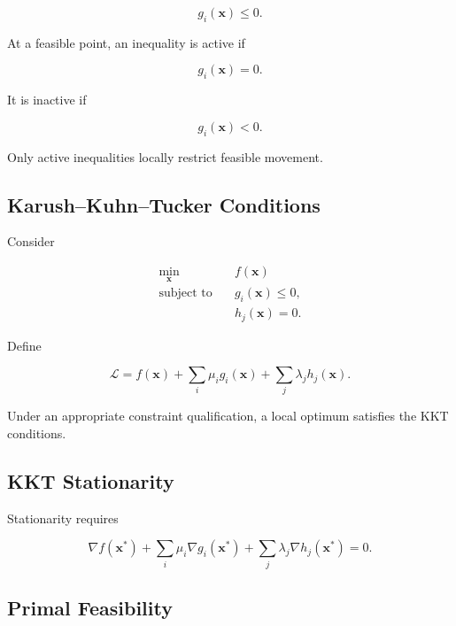 \[
\boxed{
g_i(\mathbf{x})\leq0.
}
\]

At a feasible point, an inequality is active if

\[
\boxed{
g_i(\mathbf{x})=0.
}
\]

It is inactive if

\[
\boxed{
g_i(\mathbf{x})<0.
}
\]

Only active inequalities locally restrict feasible movement.

\subsection{Karush--Kuhn--Tucker Conditions}
\label{subsec:kkt-conditions}

Consider

\[
\begin{aligned}
\min_{\mathbf{x}}
\quad&
f(\mathbf{x})
\\
\text{subject to}
\quad&
g_i(\mathbf{x})\leq0,
\\
&
h_j(\mathbf{x})=0.
\end{aligned}
\]

Define

\[
\boxed{
\mathcal{L}
=
f(\mathbf{x})
+
\sum_i
\mu_i g_i(\mathbf{x})
+
\sum_j
\lambda_j h_j(\mathbf{x}).
}
\]

Under an appropriate constraint qualification, a local optimum satisfies
the KKT conditions.

\subsection{KKT Stationarity}
\label{subsec:kkt-stationarity}

Stationarity requires

\[
\boxed{
\nabla f(\mathbf{x}^*)
+
\sum_i
\mu_i
\nabla g_i(\mathbf{x}^*)
+
\sum_j
\lambda_j
\nabla h_j(\mathbf{x}^*)
=
0.
}
\]

\subsection{Primal Feasibility}
\label{subsec:kkt-primal-feasibility}


